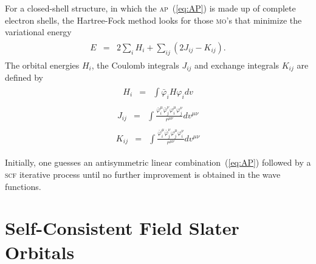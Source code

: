 For a closed-shell structure, in which the \textsc{ap}~(\ref{eq:AP})
is made up of complete electron shells, the Hartree-Fock method looks
for those \textsc{mo}'s that minimize the variational energy
%
\begin{eqnarray}
  \begin{split}
    E & = & 2\sum\limits_{i} H_{i} + \sum\limits_{ij} (2J_{ij} -
    K_{ij}).
  \end{split}
  \label{eq:HF_energy}
\end{eqnarray}
%
The orbital energies $H_{i}$, the Coulomb integrals $J_{ij}$ and
exchange integrals $K_{ij}$ are defined by~\cite{Roothaan_HF}
%
\begin{eqnarray}
  \begin{split}
    H_{i} & = & \int \bar{\varphi}_{i} H \varphi_{i} dv
  \end{split}
  \label{eq:orbital_Hi}
\end{eqnarray}
%
\begin{eqnarray}
  \begin{split}
    J_{ij} & = & \int \frac{\bar\varphi_{i}^{\mu} \bar\varphi_{j}^{\nu}
      \varphi_{i}^{\mu} \varphi_{j}^{\nu}}{r^{\mu\nu}} dv^{\mu\nu}
  \end{split}
  \label{eq:Coulomb_integral}
\end{eqnarray}
%
\begin{eqnarray}
  \begin{split}
    K_{ij} & = & \int \frac{\bar\varphi_{i}^{\mu} \bar\varphi_{j}^{\nu}
      \varphi_{j}^{\mu} \varphi_{i}^{\nu}}{r^{\mu\nu}} dv^{\mu\nu}
  \end{split}
  \label{eq:exchange_integral}
\end{eqnarray}


Initially, one guesses an antisymmetric linear
combination~(\ref{eq:AP}) followed by a \textsc{scf} iterative process
until no further improvement is obtained in the wave functions. 





\section{Self-Consistent Field Slater Orbitals}
\label{ch:scf_sto}




